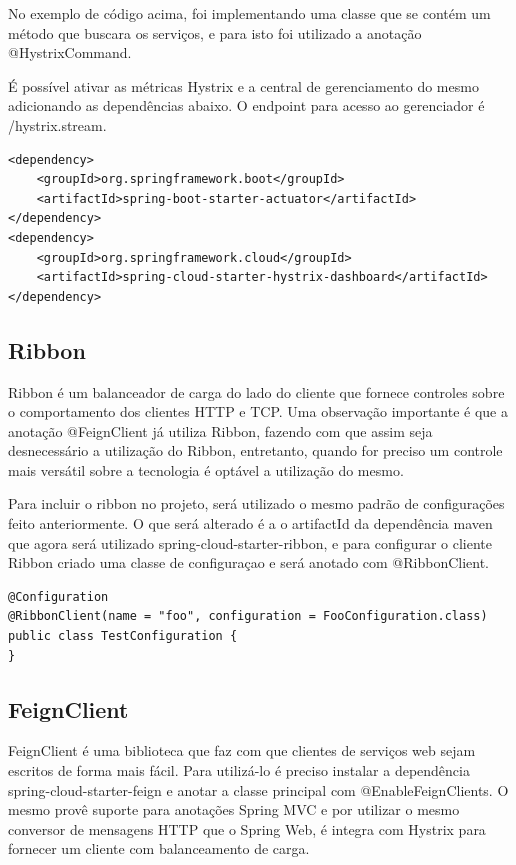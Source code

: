 No exemplo de código acima, foi implementando uma classe que se contém um método que buscara os serviços, e para isto foi utilizado a anotação @HystrixCommand.

É possível ativar as métricas Hystrix e a central de gerenciamento do mesmo adicionando as dependências abaixo. O endpoint para acesso ao gerenciador é /hystrix.stream.

\begin{verbatim}
<dependency>
    <groupId>org.springframework.boot</groupId>
    <artifactId>spring-boot-starter-actuator</artifactId>
</dependency>
<dependency>
    <groupId>org.springframework.cloud</groupId>
    <artifactId>spring-cloud-starter-hystrix-dashboard</artifactId>
</dependency>
\end{verbatim}

\subsection{Ribbon}

Ribbon é um  balanceador de carga do lado do cliente que fornece controles sobre o comportamento dos clientes HTTP e TCP. Uma observação importante é que a anotação @FeignClient já utiliza Ribbon, fazendo com que assim seja desnecessário a utilização do Ribbon, entretanto, quando for preciso um controle mais versátil sobre a tecnologia é optável a utilização do mesmo.

Para incluir o ribbon no projeto, será utilizado o mesmo padrão de configurações feito anteriormente. O que será alterado é a o artifactId da dependência maven que agora será utilizado spring-cloud-starter-ribbon, e para configurar o cliente Ribbon criado uma classe de configuraçao e será anotado com @RibbonClient. 

\begin{verbatim}
@Configuration
@RibbonClient(name = "foo", configuration = FooConfiguration.class)
public class TestConfiguration {
}
\end{verbatim}

\subsection{FeignClient}

FeignClient é uma biblioteca que faz com que clientes de serviços web sejam escritos de forma mais fácil. Para utilizá-lo é preciso instalar a dependência spring-cloud-starter-feign e anotar a classe principal com @EnableFeignClients. O mesmo provê suporte para anotações Spring MVC e por utilizar o mesmo conversor de mensagens HTTP que o Spring Web, é integra com Hystrix para fornecer um cliente com balanceamento de carga.

